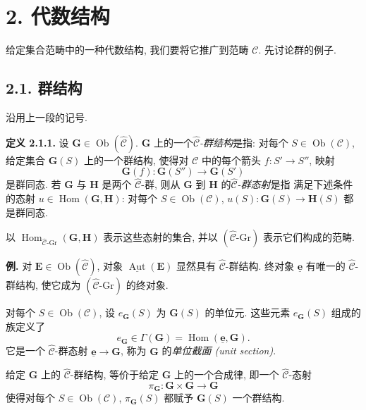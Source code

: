 \section*{2. 代数结构}

给定集合范畴中的一种代数结构, 我们要将它推广到范畴 \(\mathscr C\).
先讨论群的例子.

\subsection*{2.1. 群结构}

沿用上一段的记号.

\medskip
\noindent{}\textbf{定义 2.1.1.}
设 \(\mathbf G\in\operatorname{Ob}(\widehat{\mathscr C})\).
\(\mathbf G\) 上的一个\emph{\(\widehat{\mathscr C}\)-群结构}是指: 对每个
\(S\in\operatorname{Ob}(\mathscr C)\), 给定集合 \(\mathbf G(S)\) 上的一个群结构,
使得对 \(\mathscr C\) 中的每个箭头 \(f:S'\to S''\), 映射
\[
  \mathbf G(f):\mathbf G(S'')\longrightarrow\mathbf G(S')
\]
是群同态. 若 \(\mathbf G\) 与 \(\mathbf H\) 是两个 \(\widehat{\mathscr C}\)-群,
则从 \(\mathbf G\) 到 \(\mathbf H\) 的\emph{\(\widehat{\mathscr C}\)-群态射}是指
满足下述条件的态射 \(u\in\operatorname{Hom}(\mathbf G,\mathbf H)\): 对每个
\(S\in\operatorname{Ob}(\mathscr C)\), \(u(S):\mathbf G(S)\to\mathbf H(S)\)
都是群同态.

以
\(\operatorname{Hom}_{\widehat{\mathscr C}\text{-}\mathrm{Gr}}
  (\mathbf G,\mathbf H)\)
表示这些态射的集合, 并以 \((\widehat{\mathscr C}\text{-}\mathrm{Gr})\) 表示它们构成的范畴.

\medskip
\noindent\textbf{例.}
对 \(\mathbf E\in\operatorname{Ob}(\widehat{\mathscr C})\), 对象
\(\underline{\operatorname{Aut}}(\mathbf E)\) 显然具有
\(\widehat{\mathscr C}\)-群结构. 终对象 \(\underline{\mathbf e}\) 有唯一的
\(\widehat{\mathscr C}\)-群结构, 使它成为 \((\widehat{\mathscr C}\text{-}\mathrm{Gr})\)
的终对象.

对每个 \(S\in\operatorname{Ob}(\mathscr C)\), 设 \(e_{\mathbf G}(S)\) 为
\(\mathbf G(S)\) 的单位元. 这些元素 \(e_{\mathbf G}(S)\) 组成的族定义了
\[
  e_{\mathbf G}\in\Gamma(\mathbf G)
  =\operatorname{Hom}(\underline{\mathbf e},\mathbf G).
\]
它是一个 \(\widehat{\mathscr C}\)-群态射 \(\underline{\mathbf e}\to\mathbf G\),
称为 \(\mathbf G\) 的\emph{单位截面 (unit section)}.

给定 \(\mathbf G\) 上的 \(\widehat{\mathscr C}\)-群结构, 等价于给定
\(\mathbf G\) 上的一个合成律, 即一个 \(\widehat{\mathscr C}\)-态射
\[
  \pi_{\mathbf G}:\mathbf G\times\mathbf G\longrightarrow\mathbf G
\]
使得对每个 \(S\in\operatorname{Ob}(\mathscr C)\), \(\pi_{\mathbf G}(S)\) 都赋予
\(\mathbf G(S)\) 一个群结构.


